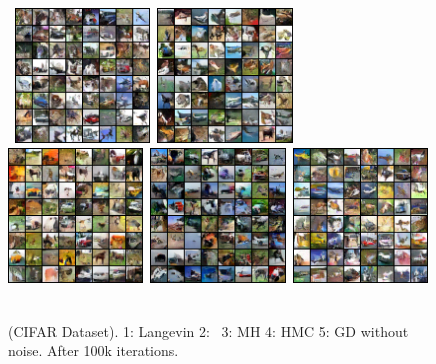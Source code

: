 \documentclass{article} %
\begin{document}
\begin{figure}

    \mbox{\hspace{-0.05in}
        \includegraphics[width=1.41in]{figs/cifarlangevin}
        \includegraphics[width=1.41in]{figs/cifaranila}
	\includegraphics[width=1.41in]{figs/mh_x_q_099900}        
        \includegraphics[width=1.41in]{figs/hmc_x_q_099900}
        \includegraphics[width=1.41in]{figs/gd_x_q_099900}
        }
\caption{(CIFAR Dataset). 1: Langevin 2: \algo\ 3: MH 4: HMC 5: GD without noise. After 100k iterations.}
	\label{fig:cifar}\vspace{-0.1in}
\end{figure}
\end{document}
